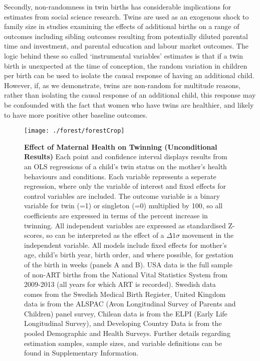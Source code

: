 \documentclass{nature}
\begin{document}
\begin{linenumbers}
Secondly, non-randomness in twin births has considerable implications for estimates from social science research.  Twins are used as an exogenous shock to family size in studies examining the effects of additional births on a range of outcomes including sibling outcomes resulting from potentially diluted parental time and investment, and parental education and labour market outcomes.  The logic behind these so called `instrumental variables' estimates is that if a twin birth is unexpected at the time of conception, the random variation in children per birth can be used to isolate the causal response of having an additional child.  However, if, as we demonstrate, twins are non-random for multitude reasons, rather than isolating the causal response of an additional child, this response may be confounded with the fact that women who have twins are healthier, and likely to have more positive other baseline outcomes.


\clearpage
%

\thispagestyle{empty}
\begin{spacing}{1}
\begin{figure}
\begin{center}
  \texttt{[image: ./forest/forestCrop]}
\end{center}
\caption{\textbf{Effect of Maternal Health on Twinning (Unconditional Results)} {\footnotesize Each point and confidence interval displays results from an OLS regressions of a child's twin status on the mother's health behaviours and conditions. Each variable represents a seperate regression, where only the variable of interest and fixed effects for control variables are included. The outcome variable is a binary variable for twin (=1) or singleton (=0) multiplied by 100, so all coefficients are expressed in terms of the percent increase in twinning.  All independent variables are expressed as standardised Z-scores, so can be interpreted as the effect of a $\Delta 1\sigma$ movement in the independent variable. All models include fixed effects for mother's age, child's birth year, birth order, and where possible, for gestation of the birth in weeks (panels A and B).  USA data is the full sample of non-ART births from the National Vital Statistics System from 2009-2013 (all years for which ART is recorded).  Swedish data comes from the Swedish Medical Birth Register, United Kingdom data is from the ALSPAC (Avon Longitudinal Survey of Parents and Children) panel survey, Chilean data is from the ELPI (Early Life Longitudinal Survey), and Developing Country Data is from the pooled Demographic and Health Surveys. Further details regarding estimation samples, sample sizes, and variable definitions can be found in Supplementary Information.}}
\label{fig:fullEsts}
\end{figure}



\end{spacing}
\end{linenumbers}
\end{document}
